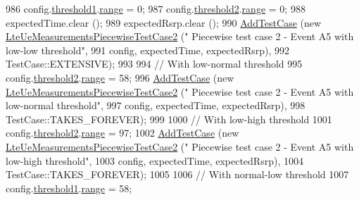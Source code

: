 \begin{DoxyCode}
986   config.\hyperlink{structns3_1_1LteRrcSap_1_1ReportConfigEutra_a8f36bc45a61054920e490be8bf33b4ca}{threshold1}.\hyperlink{structns3_1_1LteRrcSap_1_1ThresholdEutra_abd4950e20a1a93727535e8364bf85b03}{range} = 0;
987   config.\hyperlink{structns3_1_1LteRrcSap_1_1ReportConfigEutra_a4c76552279ea09626d15b48b341bfbd1}{threshold2}.\hyperlink{structns3_1_1LteRrcSap_1_1ThresholdEutra_abd4950e20a1a93727535e8364bf85b03}{range} = 0;
988   expectedTime.clear ();
989   expectedRsrp.clear ();
990   \hyperlink{classns3_1_1TestCase_a3718088e3eefd5d6454569d2e0ddd835}{AddTestCase} (\textcolor{keyword}{new} \hyperlink{classLteUeMeasurementsPiecewiseTestCase2}{LteUeMeasurementsPiecewiseTestCase2} (\textcolor{stringliteral}{"
      Piecewise test case 2 - Event A5 with low-low threshold"},
991                                                         config, expectedTime, expectedRsrp),
992                TestCase::EXTENSIVE);
993 
994   \textcolor{comment}{// With low-normal threshold}
995   config.\hyperlink{structns3_1_1LteRrcSap_1_1ReportConfigEutra_a4c76552279ea09626d15b48b341bfbd1}{threshold2}.\hyperlink{structns3_1_1LteRrcSap_1_1ThresholdEutra_abd4950e20a1a93727535e8364bf85b03}{range} = 58;
996   \hyperlink{classns3_1_1TestCase_a3718088e3eefd5d6454569d2e0ddd835}{AddTestCase} (\textcolor{keyword}{new} \hyperlink{classLteUeMeasurementsPiecewiseTestCase2}{LteUeMeasurementsPiecewiseTestCase2} (\textcolor{stringliteral}{"
      Piecewise test case 2 - Event A5 with low-normal threshold"},
997                                                         config, expectedTime, expectedRsrp),
998                TestCase::TAKES\_FOREVER);
999 
1000   \textcolor{comment}{// With low-high threshold}
1001   config.\hyperlink{structns3_1_1LteRrcSap_1_1ReportConfigEutra_a4c76552279ea09626d15b48b341bfbd1}{threshold2}.\hyperlink{structns3_1_1LteRrcSap_1_1ThresholdEutra_abd4950e20a1a93727535e8364bf85b03}{range} = 97;
1002   \hyperlink{classns3_1_1TestCase_a3718088e3eefd5d6454569d2e0ddd835}{AddTestCase} (\textcolor{keyword}{new} \hyperlink{classLteUeMeasurementsPiecewiseTestCase2}{LteUeMeasurementsPiecewiseTestCase2} (\textcolor{stringliteral}{"
      Piecewise test case 2 - Event A5 with low-high threshold"},
1003                                                         config, expectedTime, expectedRsrp),
1004                TestCase::TAKES\_FOREVER);
1005 
1006   \textcolor{comment}{// With normal-low threshold}
1007   config.\hyperlink{structns3_1_1LteRrcSap_1_1ReportConfigEutra_a8f36bc45a61054920e490be8bf33b4ca}{threshold1}.\hyperlink{structns3_1_1LteRrcSap_1_1ThresholdEutra_abd4950e20a1a93727535e8364bf85b03}{range} = 58;

\end{DoxyCode}
